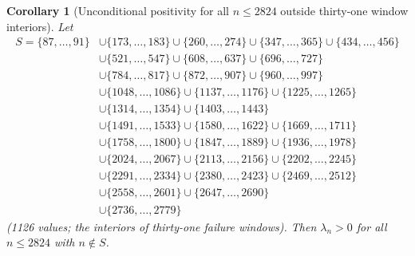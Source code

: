 \documentclass[11pt]{article}
\newtheorem{corollary}[theorem]{Corollary}
\begin{document}
\begin{corollary}[Unconditional positivity for all $n \leq 2824$ outside thirty-one window interiors]
\label{cor:n86}
Let
\begin{align*}
  S = \{87,\ldots,91\} &\cup \{173,\ldots,183\} \cup \{260,\ldots,274\}
      \cup \{347,\ldots,365\} \cup \{434,\ldots,456\} \\
      &\cup \{521,\ldots,547\} \cup \{608,\ldots,637\} \cup \{696,\ldots,727\} \\
      &\cup \{784,\ldots,817\} \cup \{872,\ldots,907\} \cup \{960,\ldots,997\} \\
      &\cup \{1048,\ldots,1086\} \cup \{1137,\ldots,1176\} \cup \{1225,\ldots,1265\} \\
      &\cup \{1314,\ldots,1354\} \cup \{1403,\ldots,1443\} \\
      &\cup \{1491,\ldots,1533\} \cup \{1580,\ldots,1622\} \cup \{1669,\ldots,1711\} \\
      &\cup \{1758,\ldots,1800\} \cup \{1847,\ldots,1889\} \cup \{1936,\ldots,1978\} \\
      &\cup \{2024,\ldots,2067\} \cup \{2113,\ldots,2156\} \cup \{2202,\ldots,2245\} \\
      &\cup \{2291,\ldots,2334\} \cup \{2380,\ldots,2423\} \cup \{2469,\ldots,2512\} \\
      &\cup \{2558,\ldots,2601\} \cup \{2647,\ldots,2690\} \\
      &\cup \{2736,\ldots,2779\}
\end{align*}
(1126 values; the interiors of thirty-one failure windows).
Then $\lambda_n > 0$ for all $n \leq 2824$ with $n \notin S$.
\end{corollary}
\end{document}
